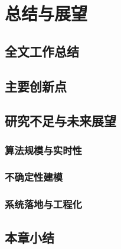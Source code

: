 \chapter{总结与展望}

\section{全文工作总结}

\section{主要创新点}

\section{研究不足与未来展望}
\subsection{算法规模与实时性}
\subsection{不确定性建模}
\subsection{系统落地与工程化}

\section{本章小结}
